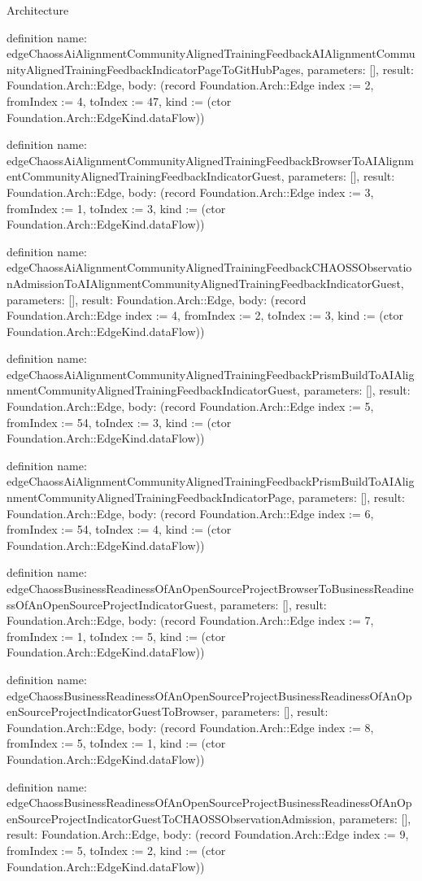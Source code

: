 \begin{lexlean}{Architecture}
\begin{semanticmodule}
definition{
  name: edgeChaossAiAlignmentCommunityAlignedTrainingFeedbackAIAlignmentCommunityAlignedTrainingFeedbackIndicatorPageToGitHubPages,
  parameters: [],
  result: Foundation.Arch::Edge,
  body: (record Foundation.Arch::Edge {index := 2, fromIndex := 4, toIndex := 47, kind := (ctor Foundation.Arch::EdgeKind.dataFlow)})
}

definition{
  name: edgeChaossAiAlignmentCommunityAlignedTrainingFeedbackBrowserToAIAlignmentCommunityAlignedTrainingFeedbackIndicatorGuest,
  parameters: [],
  result: Foundation.Arch::Edge,
  body: (record Foundation.Arch::Edge {index := 3, fromIndex := 1, toIndex := 3, kind := (ctor Foundation.Arch::EdgeKind.dataFlow)})
}

definition{
  name: edgeChaossAiAlignmentCommunityAlignedTrainingFeedbackCHAOSSObservationAdmissionToAIAlignmentCommunityAlignedTrainingFeedbackIndicatorGuest,
  parameters: [],
  result: Foundation.Arch::Edge,
  body: (record Foundation.Arch::Edge {index := 4, fromIndex := 2, toIndex := 3, kind := (ctor Foundation.Arch::EdgeKind.dataFlow)})
}

definition{
  name: edgeChaossAiAlignmentCommunityAlignedTrainingFeedbackPrismBuildToAIAlignmentCommunityAlignedTrainingFeedbackIndicatorGuest,
  parameters: [],
  result: Foundation.Arch::Edge,
  body: (record Foundation.Arch::Edge {index := 5, fromIndex := 54, toIndex := 3, kind := (ctor Foundation.Arch::EdgeKind.dataFlow)})
}

definition{
  name: edgeChaossAiAlignmentCommunityAlignedTrainingFeedbackPrismBuildToAIAlignmentCommunityAlignedTrainingFeedbackIndicatorPage,
  parameters: [],
  result: Foundation.Arch::Edge,
  body: (record Foundation.Arch::Edge {index := 6, fromIndex := 54, toIndex := 4, kind := (ctor Foundation.Arch::EdgeKind.dataFlow)})
}

definition{
  name: edgeChaossBusinessReadinessOfAnOpenSourceProjectBrowserToBusinessReadinessOfAnOpenSourceProjectIndicatorGuest,
  parameters: [],
  result: Foundation.Arch::Edge,
  body: (record Foundation.Arch::Edge {index := 7, fromIndex := 1, toIndex := 5, kind := (ctor Foundation.Arch::EdgeKind.dataFlow)})
}

definition{
  name: edgeChaossBusinessReadinessOfAnOpenSourceProjectBusinessReadinessOfAnOpenSourceProjectIndicatorGuestToBrowser,
  parameters: [],
  result: Foundation.Arch::Edge,
  body: (record Foundation.Arch::Edge {index := 8, fromIndex := 5, toIndex := 1, kind := (ctor Foundation.Arch::EdgeKind.dataFlow)})
}

definition{
  name: edgeChaossBusinessReadinessOfAnOpenSourceProjectBusinessReadinessOfAnOpenSourceProjectIndicatorGuestToCHAOSSObservationAdmission,
  parameters: [],
  result: Foundation.Arch::Edge,
  body: (record Foundation.Arch::Edge {index := 9, fromIndex := 5, toIndex := 2, kind := (ctor Foundation.Arch::EdgeKind.dataFlow)})
}


\end{semanticmodule}
\end{lexlean}
